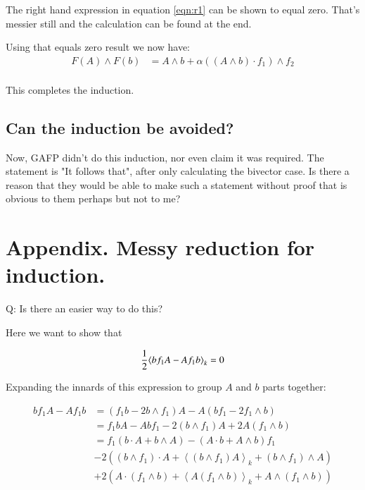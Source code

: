 \documentclass{article}
\newcommand{\gpgrade}[2] {{\left\langle{{#1}}\right\rangle}_{#2}}
\begin{document}
The right hand expression in equation \ref{eqn:r1} can be shown to equal zero.  That's messier still and the calculation can be found 
at the end.

Using that equals zero result we now have:
\begin{align*}
F(A) \wedge F(b)
&= A \wedge b + \alpha ((A \wedge b) \cdot f_1) \wedge f_2 \\
\end{align*}

This completes the induction.

\subsection{ Can the induction be avoided? }

Now, GAFP didn't do this induction, nor even claim it was required.  The statement is "It follows that", after only calculating the bivector
case.  Is there a reason that they would be able to make such a statement without proof that is obvious to them perhaps but not to me?


\section{ Appendix. Messy reduction for induction. }

Q: Is there an easier way to do this?

Here we want to show that 

\begin{equation*}
\inv{2} \gpgrade{ b f_1 A - A f_1 b}{k} = 0
\end{equation*}

Expanding the innards of this expression to group $A$ and $b$ parts together:

\begin{align*}
b f_1 A - A f_1 b
&= (f_1 b - 2 b \wedge f_1 ) A - A (b f_1 - 2 f_1 \wedge b) \\
&= 
f_1 b A - A b f_1
- 2 (b \wedge f_1) A + 2 A (f_1 \wedge b) \\
&= 
f_1 (b \cdot A + b \wedge A) - (A \cdot b + A \wedge b) f_1 \\
&- 2 \left( (b \wedge f_1) \cdot A + \gpgrade{(b \wedge f_1) A}{k} + (b \wedge f_1) \wedge A \right) \\
&+ 2 \left( A \cdot (f_1 \wedge b) + \gpgrade{A (f_1 \wedge b)}{k} + A \wedge (f_1 \wedge b) \right) 
\end{align*}
\end{document}
